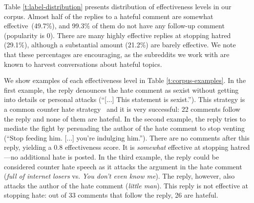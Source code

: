\documentclass[11pt]{article}
\begin{document}
Table \ref{t:label-distribution} presents distribution of effectiveness levels in our corpus.
Almost half of the replies to a hateful comment are somewhat effective~(49.7\%),
and 99.3\% of them do not have any follow-up comment (popularity is 0).
There are many highly effective replies at stopping hatred (29.1\%),
although a substantial amount (21.2\%) are barely effective.
We note that these percentages are encouraging, as the subreddits we work with are known to harvest conversations about hateful topics.

We show examples of each effectiveness level in Table \ref{t:corpus-examples}. 
In the first example, the reply denounces the hate comment as sexist without getting into details or personal attacks (``[...] This statement is sexist.'').
This strategy is a common counter hate strategy~\cite{DBLP:conf/icwsm/MathewSTRSMG019} and it is very successful: 22 comments follow the reply and none of them are hateful.
In the second example, the reply tries to mediate the fight by persuading the author of the hate comment to stop venting (``Stop feeding him. [...] you're indulging him.'').
There are no comments after this reply, yielding a 0.8 effectiveness score.
It is \emph{somewhat} effective at stopping hatred---no additional hate is posted.
In the third example,
the reply could be considered counter hate speech as it attacks the argument in the hate comment (\emph{full of internet losers} vs. \emph{You don't even know me}).
The reply, however, also attacks the author of the hate comment (\emph{little man}).
This reply is not effective at stopping hate: out of 33 comments that follow the reply, 26 are hateful.
\end{document}
